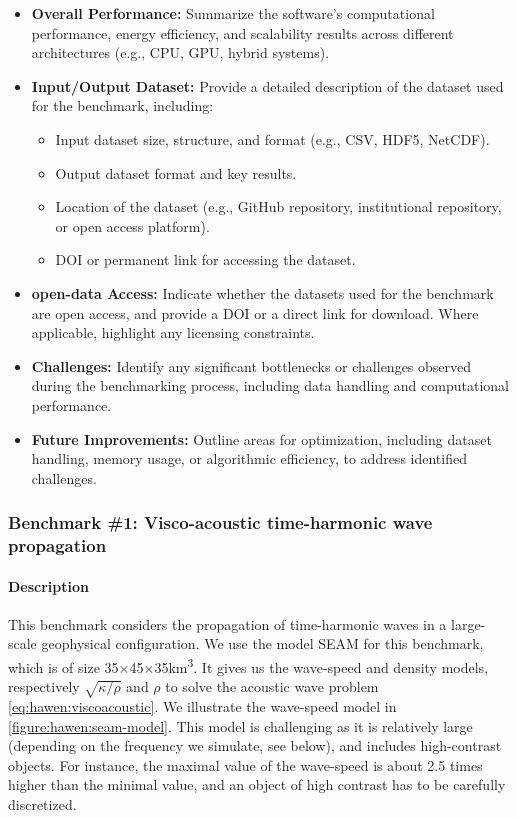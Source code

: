 \begin{itemize}
    \item \textbf{Overall Performance:} Summarize the software's computational performance, energy efficiency, and scalability results across different architectures (e.g., CPU, GPU, hybrid systems).
    \item \textbf{Input/Output Dataset:} Provide a detailed description of the dataset used for the benchmark, including:
        \begin{itemize}
            \item Input dataset size, structure, and format (e.g., CSV, HDF5, NetCDF).
            \item Output dataset format and key results.
            \item Location of the dataset (e.g., GitHub repository, institutional repository, or open access platform).
            \item DOI or permanent link for accessing the dataset.
        \end{itemize}
    \item \textbf{open-data Access:} Indicate whether the datasets used for the benchmark are open access, and provide a DOI or a direct link for download. Where applicable, highlight any licensing constraints.
    \item \textbf{Challenges:} Identify any significant bottlenecks or challenges observed during the benchmarking process, including data handling and computational performance.
    \item \textbf{Future Improvements:} Outline areas for optimization, including dataset handling, memory usage, or algorithmic efficiency, to address identified challenges.
\end{itemize}

\subsubsection{Benchmark \#1: Visco-acoustic time-harmonic wave propagation}

\paragraph{Description}
This benchmark considers the propagation of time-harmonic waves in a large-scale
geophysical configuration. We use the model SEAM for this benchmark, which is of
size \num{35}$\times$\num{45}$\times$\num{35}\si{\km\cubed}.  
It gives us the wave-speed and density models, respectively $\sqrt{\kappa/\rho}$ 
and $\rho$ to solve the acoustic wave problem \cref{eq:hawen:viscoacoustic}.
We illustrate the wave-speed model in \cref{figure:hawen:seam-model}.
This model is challenging as it is relatively large (depending on the frequency
we simulate, see below), and includes high-contrast objects. 
For instance, the maximal value of the wave-speed is about 2.5 times higher than
the minimal value, and an object of high contrast has to be carefully discretized.


